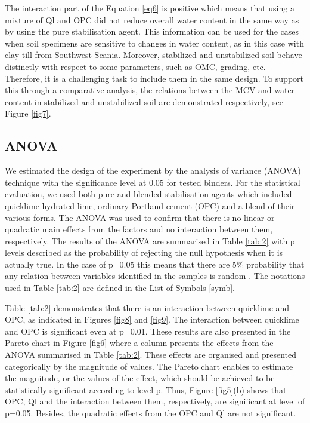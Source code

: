 \documentclass[eprint,
]{actapoly}
\begin{document}
The interaction part of the Equation \ref{eq6} is positive which means that using a mixture of Ql and OPC did not reduce overall  water content in the same way as by using the pure stabilisation agent. This information can be used for the cases when soil specimens are sensitive to changes in water content, as in this case with clay till from Southwest Scania. Moreover, stabilized and unstabilized soil behave distinctly with respect to some parameters, such as OMC, grading, etc. Therefore, it is a challenging task to include them in the same design. To support this through a comparative analysis, the relations between the MCV and water content in stabilized and unstabilized soil are demonstrated respectively, see Figure \ref{fig7}. 

\subsection{ANOVA}
We estimated the design of the experiment by the analysis of variance (ANOVA) technique with the significance level at 0.05 for tested binders. For the statistical evaluation, we used both pure and blended stabilisation agents which included quicklime hydrated lime, ordinary Portland cement (OPC) and a blend of their various forms. The ANOVA was used to confirm that there is no linear or quadratic main effects from the factors and no interaction between them, respectively. The results of the ANOVA are summarised in Table \ref{tab:2} with p levels described as the probability of rejecting the null hypothesis when it is actually true. In the case of p=0.05 this means that there are 5\% probability that any relation between variables identified in the samples is random \cite{StatSoft}. The notations used in Table \ref{tab:2} are defined in the List of Symbols \ref{symb}.

Table \ref{tab:2} demonstrates that there is an interaction between quicklime and OPC, as indicated in Figures \ref{fig8} and \ref{fig9}. The interaction between quicklime and OPC is significant even at p=0.01. These results are also presented in the Pareto chart in Figure \ref{fig6} where a column presents the effects from the ANOVA summarised in Table \ref{tab:2}. These effects are organised and presented categorically by the magnitude of values. The Pareto chart enables to estimate the magnitude, or the values of the effect, which should be achieved to be statistically significant according  to level p. Thus, Figure \ref{fig5}(b) shows that OPC, Ql and the interaction between them, respectively, are significant at level of p=0.05. Besides, the quadratic effects from the OPC and Ql are not significant. 
\end{document}
